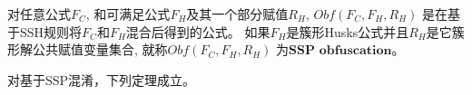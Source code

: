 %

\begin{definition}\label{4:OBFUSCATORSSH}
对任意公式$F_C$, 和可满足公式$F_H$及其一个部分赋值$R_H$,
$Obf(F_C,F_H,R_H)$ 是在基于SSH规则将$F_C$和$F_H$混合后得到的公式。
如果$F_H$是簇形Husks公式并且$R_H$是它簇形解公共赋值变量集合, 就称$Obf(F_C,F_H,R_H)$ 为${\textbf{SSP obfuscation}}$。
\end{definition}

对基于SSP混淆，下列定理成立。

